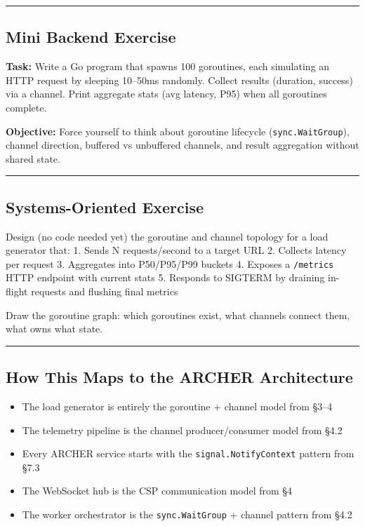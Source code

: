 \documentclass[11pt,openany]{book}
\providecommand{\tightlist}{%
  \setlength{\itemsep}{0pt}\setlength{\parskip}{0pt}}
\begin{document}
\begin{center}\rule{0.5\linewidth}{0.5pt}\end{center}

\hypertarget{mini-backend-exercise}{%
\subsection{Mini Backend Exercise}\label{mini-backend-exercise}}

\textbf{Task:} Write a Go program that spawns 100 goroutines, each
simulating an HTTP request by sleeping 10--50ms randomly. Collect
results (duration, success) via a channel. Print aggregate stats (avg
latency, P95) when all goroutines complete.

\textbf{Objective:} Force yourself to think about goroutine lifecycle
(\texttt{sync.WaitGroup}), channel direction, buffered vs unbuffered
channels, and result aggregation without shared state.

\begin{center}\rule{0.5\linewidth}{0.5pt}\end{center}

\hypertarget{systems-oriented-exercise}{%
\subsection{Systems-Oriented Exercise}\label{systems-oriented-exercise}}

Design (no code needed yet) the goroutine and channel topology for a
load generator that: 1. Sends N requests/second to a target URL 2.
Collects latency per request 3. Aggregates into P50/P95/P99 buckets 4.
Exposes a \texttt{/metrics} HTTP endpoint with current stats 5. Responds
to SIGTERM by draining in-flight requests and flushing final metrics

Draw the goroutine graph: which goroutines exist, what channels connect
them, what owns what state.

\begin{center}\rule{0.5\linewidth}{0.5pt}\end{center}

\hypertarget{how-this-maps-to-the-archer-architecture}{%
\subsection{How This Maps to the ARCHER
Architecture}\label{how-this-maps-to-the-archer-architecture}}

\begin{itemize}
\tightlist
\item
  The load generator is entirely the goroutine + channel model from
  §3--4
\item
  The telemetry pipeline is the channel producer/consumer model from
  §4.2
\item
  Every ARCHER service starts with the \texttt{signal.NotifyContext}
  pattern from §7.3
\item
  The WebSocket hub is the CSP communication model from §4
\item
  The worker orchestrator is the \texttt{sync.WaitGroup} + channel
  pattern from §4.2
\end{itemize}
\end{document}
